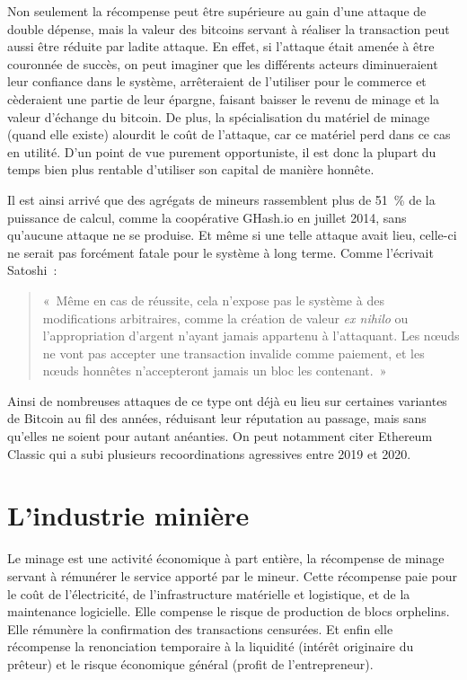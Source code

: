 Non seulement la récompense peut être supérieure au gain d'une attaque de double dépense, mais la valeur des bitcoins servant à réaliser la transaction peut aussi être réduite par ladite attaque. En effet, si l'attaque était amenée à être couronnée de succès, on peut imaginer que les différents acteurs diminueraient leur confiance dans le système, arrêteraient de l'utiliser pour le commerce et cèderaient une partie de leur épargne, faisant baisser le revenu de minage et la valeur d'échange du bitcoin. De plus, la spécialisation du matériel de minage (quand elle existe) alourdit le coût de l'attaque, car ce matériel perd dans ce cas en utilité. D'un point de vue purement opportuniste, il est donc la plupart du temps bien plus rentable d'utiliser son capital de manière honnête.

Il est ainsi arrivé que des agrégats de mineurs rassemblent plus de 51~\% de la puissance de calcul, comme la coopérative GHash.io en juillet 2014, sans qu'aucune attaque ne se produise. Et même si une telle attaque avait lieu, celle-ci ne serait pas forcément fatale pour le système à long terme. Comme l'écrivait Satoshi~:

\begin{quote}
«~Même en cas de réussite, cela n'expose pas le système à des modifications arbitraires, comme la création de valeur \emph{ex nihilo} ou l'appropriation d'argent n'ayant jamais appartenu à l'attaquant. Les nœuds ne vont pas accepter une transaction invalide comme paiement, et les nœuds honnêtes n'accepteront jamais un bloc les contenant.~»
\end{quote}

Ainsi de nombreuses attaques de ce type ont déjà eu lieu sur certaines variantes de Bitcoin au fil des années, réduisant leur réputation au passage, mais sans qu'elles ne soient pour autant anéanties. On peut notamment citer Ethereum Classic qui a subi plusieurs recoordinations agressives entre 2019 et 2020.

\section*{L'industrie minière}

Le minage est une activité économique à part entière, la récompense de minage servant à rémunérer le service apporté par le mineur. Cette récompense paie pour le coût de l'électricité, de l'infrastructure matérielle et logistique, et de la maintenance logicielle. Elle compense le risque de production de blocs orphelins. Elle rémunère la confirmation des transactions censurées. Et enfin elle récompense la renonciation temporaire à la liquidité (intérêt originaire du prêteur) et le risque économique général (profit de l'entrepreneur).

